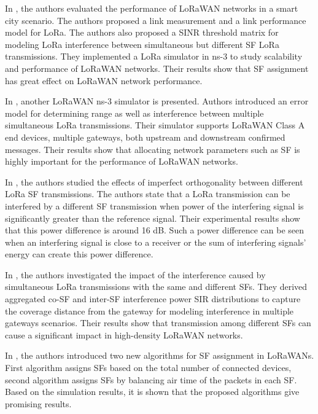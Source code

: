 \documentclass[conference]{IEEEtran}
\begin{document}
In \cite{7996384}, the authors evaluated the performance of LoRaWAN networks in a smart city scenario. The authors proposed a link measurement and a link performance model for LoRa. The authors also proposed a SINR threshold matrix for modeling LoRa interference between simultaneous but different SF LoRa transmissions. They implemented a LoRa simulator in ns-3 to study scalability and performance of LoRaWAN networks. Their results show that SF assignment has great effect on LoRaWAN network performance.

In \cite{8090518}, another LoRaWAN ns-3 simulator is presented. Authors introduced an error model for determining range as well as interference between multiple simultaneous LoRa transmissions. Their simulator supports LoRaWAN Class A end devices, multiple gateways, both upstream and downstream confirmed messages. Their results show that allocating network parameters such as SF is highly important for the performance of LoRaWAN networks.

In \cite{8267219}, the authors studied the effects of imperfect orthogonality between different LoRa SF transmissions. The authors state that a LoRa transmission can be interfered by a different SF transmission when power of the interfering signal is significantly greater than the reference signal. Their experimental results show that this power difference is around 16 dB. Such a power difference can be seen when an interfering signal is close to a receiver or the sum of interfering signals' energy can create this power difference.

In \cite{8430542}, the authors investigated the impact of the interference caused by simultaneous LoRa transmissions with the same and different SFs. They derived aggregated co-SF and inter-SF interference power SIR distributions to capture the coverage distance from the gateway for modeling interference in multiple gateways scenarios. Their results show that transmission among different SFs can cause a significant impact in high-density LoRaWAN networks.

In \cite{8115779}, the authors introduced two new algorithms for SF assignment in LoRaWANs.
First algorithm assigns SFs based on the total number of connected devices, second algorithm assigns SFs by balancing air time of the packets in each SF. Based on the simulation results, it is shown that the proposed algorithms give promising results.
\end{document}
